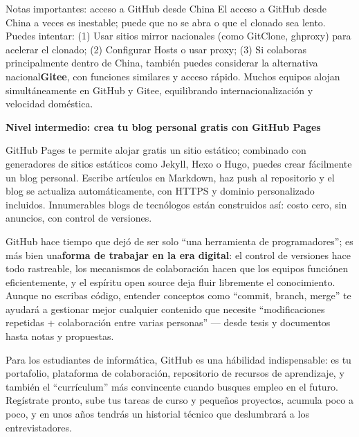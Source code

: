 \begin{tcbinfo}{Notas importantes: acceso a GitHub desde China}
El acceso a GitHub desde China a veces es inestable; puede que no se abra o que el clonado sea lento. Puedes intentar: (1) Usar sitios mirror nacionales (como GitClone, ghproxy) para acelerar el clonado; (2) Configurar Hosts o usar proxy; (3) Si colaboras principalmente dentro de China, también puedes considerar la alternativa nacional\textbf{Gitee}, con funciones similares y acceso rápido. Muchos equipos alojan simultáneamente en GitHub y Gitee, equilibrando internacionalización y velocidad doméstica.

\end{tcbinfo}

\textbf{Nivel intermedio: crea tu blog personal gratis con GitHub Pages}\par

GitHub Pages te permite alojar gratis un sitio estático; combinado con generadores de sitios estáticos como Jekyll, Hexo o Hugo, puedes crear fácilmente un blog personal. Escribe artículos en Markdown, haz push al repositorio y el blog se actualiza automáticamente, con HTTPS y dominio personalizado incluidos. Innumerables blogs de tecnólogos están construidos así: costo cero, sin anuncios, con control de versiones.


GitHub hace tiempo que dejó de ser solo “una herramienta de programadores”; es más bien una\textbf{forma de trabajar en la era digital}: el control de versiones hace todo rastreable, los mecanismos de colaboración hacen que los equipos funciónen eficientemente, y el espíritu open source deja fluir libremente el conocimiento. Aunque no escribas código, entender conceptos como “commit, branch, merge” te ayudará a gestionar mejor cualquier contenido que necesite “modificaciones repetidas + colaboración entre varias personas” — desde tesis y documentos hasta notas y propuestas.

Para los estudiantes de informática, GitHub es una hábilidad indispensable: es tu portafolio, plataforma de colaboración, repositorio de recursos de aprendizaje, y también el “currículum” más convincente cuando busques empleo en el futuro. Regístrate pronto, sube tus tareas de curso y pequeños proyectos, acumula poco a poco, y en unos años tendrás un historial técnico que deslumbrará a los entrevistadores.

